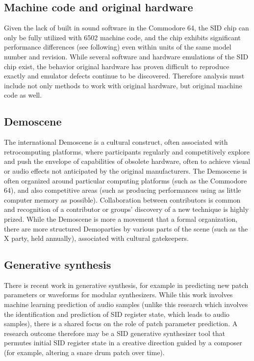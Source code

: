 \documentclass[10pt]{article}
\begin{document}
\begin{multicols*}{2}
  \subsection{Machine code and original hardware}
  Given the lack of built in sound software in the Commodore 64, the
  SID chip can only be fully utilized with 6502 machine code, and the
  chip exhibits significant performance differences (see following)
  even within units of the same model number and revision.  While
  several software and hardware emulations of the SID chip exist, the
  behavior original hardware has proven difficult to reproduce exactly
  and emulator defects continue to be discovered.  Therefore analysis
  must include not only methods to work with original hardware, but
  original machine code as well.

  \subsection{Demoscene}
  The international Demoscene is a cultural construct, often associated
  with retrocomputing platforms, where participants regularly and
  competitively explore and push the envelope of capabilities of obsolete
  hardware, often to achieve visual or audio effects not anticipated
  by the original manufacturers. The Demoscene is often organized around
  particular computing platforms (such as the Commodore 64), and also
  competitive areas (such as producing performances using as little
  computer memory as possible). Collaboration between contributors is
  common and recognition of a contributor or groups' discovery of a new
  technique is highly prized. While the Demoscene is more a movement
  that a formal organization, there are more structured Demoparties by
  various parts of the scene (such as the X party, held annually),
  associated with cultural gatekeepers.

  \subsection{Generative synthesis}
  There is recent work in generative synthesis, for example in
  predicting new patch parameters or waveforms for modular
  synthesizers.  While this work involves machine learning prediction
  of audio samples (unlike this research which involves the
  identification and prediction of SID register state, which leads to
  audio samples), there is a shared focus on the role of patch
  parameter prediction.  A research outcome therefore may be
  a SID generative synthesizer tool that permutes initial
  SID register state in a creative direction guided by a composer
  (for example, altering a snare drum patch over time).


\end{multicols*}
\end{document}
